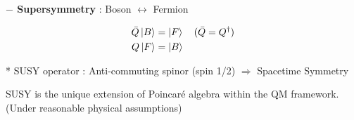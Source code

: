 \documentclass[11pt,letterpaper]{article}
\begin{document}
\VS

{\bfseries $-$ Supersymmetry} : Boson $\leftrightarrow$ Fermion

$$
\begin{aligned}
	\bar{Q}\ket{B} &= \ket{F} \quad (\bar{Q} = Q^\dagger) \\
	Q\ket{F} &= \ket{B} \\
\end{aligned}
$$

* SUSY operator : Anti-commuting spinor (spin 1/2) $\Rightarrow$ Spacetime Symmetry

\vs

\begin{note}[SUSY]
	\normalfont SUSY is the unique extension of Poincar\'{e} algebra within the QM framework. \newline
	(Under reasonable physical assumptions)
\end{note}

\vs
\end{document}
